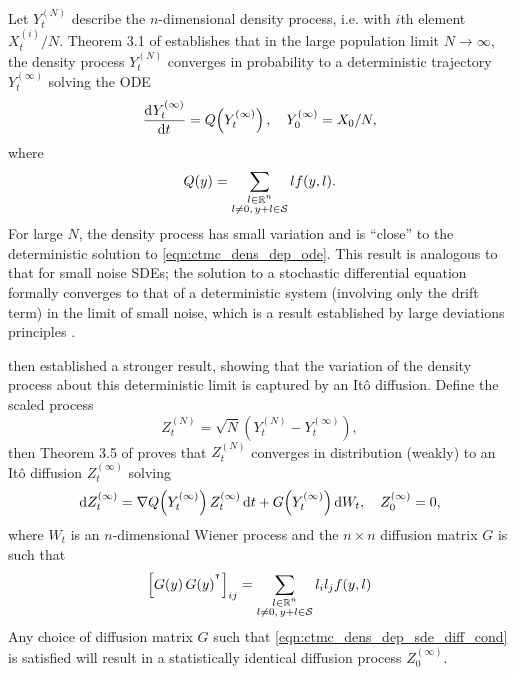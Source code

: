 Let \(Y_t^{(N)}\) describe the \(n\)-dimensional density process, i.e. with \(i\)th element \(X_t^{(i)} / N\).
Theorem 3.1 of \citet{Kurtz_1970_SolutionsOrdinaryDifferential} establishes that in the large population limit \(N \to \infty\), the density process \(Y_t^{(N)}\) converges in probability to a deterministic trajectory \(Y_t^{(\infty)}\) solving the ODE
\begin{equation}
	\dod{Y_t^{(\infty)}}{t} = Q\!\left(Y_t^{(\infty)}\right), \quad Y_0^{(\infty)} = X_0 / N,
	\label{eqn:ctmc_dens_dep_ode}
\end{equation}
where
\[
	Q\!\left(y\right) = \sum_{\substack{l \in \mathbb{R}^n \\ l \neq 0,\, y + l \in \mathcal{S}}}{l f\!\left(y, l\right)}.
\]
For large \(N\), the density process has small variation and is ``close'' to the deterministic solution to \cref{eqn:ctmc_dens_dep_ode}.
This result is analogous to that for small noise SDEs; the solution to a stochastic differential equation formally converges to that of a deterministic system (involving only the drift term) in the limit of small noise, which is a result established by large deviations principles \citep[e.g]{FreidlinWentzell_1998_RandomPerturbationsDynamical}.

\citet{Kurtz_1971_LimitTheoremsSequences} then established a stronger result, showing that the variation of the density process about this deterministic limit is captured by an It\^o diffusion.
Define the scaled process
\[
	Z_t^{(N)} = \sqrt{N}\left(Y_t^{(N)} - Y_{t}^{(\infty)}\right),
\]
then Theorem 3.5 of \citet{Kurtz_1971_LimitTheoremsSequences} proves that \(Z_t^{(N)}\) converges in distribution (weakly) to an It\^o diffusion \(Z_t^{(\infty)}\) solving
\begin{equation}
	\dif Z_t^{(\infty)} = \nabla Q\!\left(Y_t^{(\infty)}\right) Z_t^{(\infty)}\dif t + G\!\left(Y_t^{(\infty)}\right)\dif W_t, \quad Z_0^{(\infty)} = 0,
	\label{eqn:ctmc_dens_dep_sde}
\end{equation}
where \(W_t\) is an \(n\)-dimensional Wiener process and the \(n \times n\) diffusion matrix \(G\) is such that
\begin{equation}
	\left[G\!\left(y\right)G\!\left(y\right)^{^{\intercal}}\right]_{ij} = \sum_{\substack{l \in \mathbb{R}^n \\ l \neq 0,\, y + l \in \mathcal{S}}}{l_i l_j f\!\left(y,l\right)}
	\label{eqn:ctmc_dens_dep_sde_diff_cond}
\end{equation}
Any choice of diffusion matrix \(G\) such that \cref{eqn:ctmc_dens_dep_sde_diff_cond} is satisfied will result in a statistically identical diffusion process \(Z_0^{(\infty)}\).

